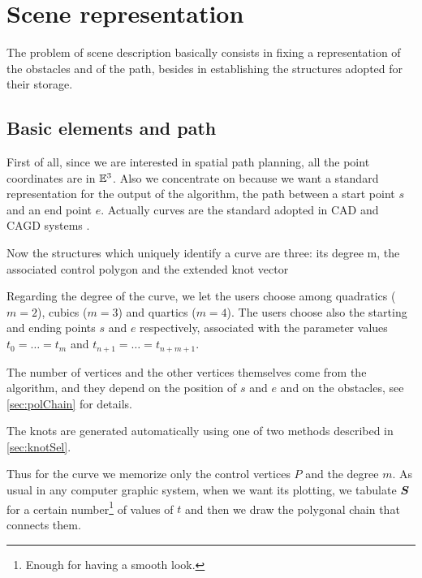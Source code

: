 \documentclass[dissertation.tex]{subfiles}
\begin{document}
\chapter{Scene representation}\label{cha:scene}
The problem of scene description basically consists in fixing a
representation of the obstacles and of the path, besides in establishing the structures adopted for their storage.

\section{Basic elements and path}
First of all, since we are interested in spatial path planning, all
the point coordinates are in $\mathbb{E}^3$. Also we concentrate
on \bss because we want a standard representation for the output of
the algorithm, the path between a start point $s$ and an end point
$e$. Actually \bss
curves are the standard adopted in \ac{CAD} and
\ac{CAGD} systems \cite{hughes}\cite{foley}. 

Now the structures which  uniquely identify a \bs curve are
three: its degree m, the associated control polygon and the extended
knot vector 

Regarding the degree of the curve, we let 
the users choose among quadratics
($m=2$), cubics ($m=3$) and quartics ($m=4$). The users
choose also the starting and ending points $s$ and $e$ respectively,
associated with the parameter values $t_0=\dots=t_m$ and
$t_{n+1}=\dots=t_{n+m+1}$.

The number
of vertices and the other vertices themselves come from the algorithm,
and they depend on the position of $s$ and $e$ and on the obstacles, see
\cref{sec:polChain} for details.

The knots are generated automatically using one of two methods
described in \cref{sec:knotSel}.

Thus for the curve we memorize only the control vertices $P$ and the
degree 
$m$. As usual in any computer graphic system, when we want its plotting, we tabulate $\boldsymbol{S}$ for a certain
number\footnote{Enough for having a smooth look.} of values of $t$ and
then we draw the polygonal chain that connects them.
\end{document}
